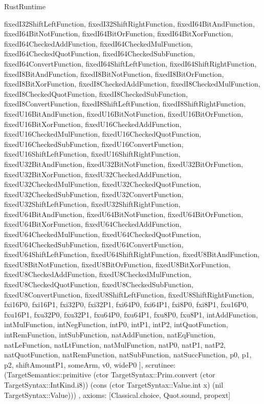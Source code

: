 \begin{lexlean}{RustRuntime}
\begin{semanticmodule}
{{      fixedI32ShiftLeftFunction,
      fixedI32ShiftRightFunction,
      fixedI64BitAndFunction,
      fixedI64BitNotFunction,
      fixedI64BitOrFunction,
      fixedI64BitXorFunction,
      fixedI64CheckedAddFunction,
      fixedI64CheckedMulFunction,
      fixedI64CheckedQuotFunction,
      fixedI64CheckedSubFunction,
      fixedI64ConvertFunction,
      fixedI64ShiftLeftFunction,
      fixedI64ShiftRightFunction,
      fixedI8BitAndFunction,
      fixedI8BitNotFunction,
      fixedI8BitOrFunction,
      fixedI8BitXorFunction,
      fixedI8CheckedAddFunction,
      fixedI8CheckedMulFunction,
      fixedI8CheckedQuotFunction,
      fixedI8CheckedSubFunction,
      fixedI8ConvertFunction,
      fixedI8ShiftLeftFunction,
      fixedI8ShiftRightFunction,
      fixedU16BitAndFunction,
      fixedU16BitNotFunction,
      fixedU16BitOrFunction,
      fixedU16BitXorFunction,
      fixedU16CheckedAddFunction,
      fixedU16CheckedMulFunction,
      fixedU16CheckedQuotFunction,
      fixedU16CheckedSubFunction,
      fixedU16ConvertFunction,
      fixedU16ShiftLeftFunction,
      fixedU16ShiftRightFunction,
      fixedU32BitAndFunction,
      fixedU32BitNotFunction,
      fixedU32BitOrFunction,
      fixedU32BitXorFunction,
      fixedU32CheckedAddFunction,
      fixedU32CheckedMulFunction,
      fixedU32CheckedQuotFunction,
      fixedU32CheckedSubFunction,
      fixedU32ConvertFunction,
      fixedU32ShiftLeftFunction,
      fixedU32ShiftRightFunction,
      fixedU64BitAndFunction,
      fixedU64BitNotFunction,
      fixedU64BitOrFunction,
      fixedU64BitXorFunction,
      fixedU64CheckedAddFunction,
      fixedU64CheckedMulFunction,
      fixedU64CheckedQuotFunction,
      fixedU64CheckedSubFunction,
      fixedU64ConvertFunction,
      fixedU64ShiftLeftFunction,
      fixedU64ShiftRightFunction,
      fixedU8BitAndFunction,
      fixedU8BitNotFunction,
      fixedU8BitOrFunction,
      fixedU8BitXorFunction,
      fixedU8CheckedAddFunction,
      fixedU8CheckedMulFunction,
      fixedU8CheckedQuotFunction,
      fixedU8CheckedSubFunction,
      fixedU8ConvertFunction,
      fixedU8ShiftLeftFunction,
      fixedU8ShiftRightFunction,
      fxi16P0,
      fxi16P1,
      fxi32P0,
      fxi32P1,
      fxi64P0,
      fxi64P1,
      fxi8P0,
      fxi8P1,
      fxu16P0,
      fxu16P1,
      fxu32P0,
      fxu32P1,
      fxu64P0,
      fxu64P1,
      fxu8P0,
      fxu8P1,
      intAddFunction,
      intMulFunction,
      intNegFunction,
      intP0,
      intP1,
      intP2,
      intQuotFunction,
      intRemFunction,
      intSubFunction,
      natAddFunction,
      natEqFunction,
      natLeFunction,
      natLtFunction,
      natMulFunction,
      natP0,
      natP1,
      natP2,
      natQuotFunction,
      natRemFunction,
      natSubFunction,
      natSuccFunction,
      p0,
      p1,
      p2,
      shiftAmountP1,
      someArm,
      v0,
      wideP0
    ],
    scrutinee: (TargetSemantics::primitive (ctor TargetSyntax::Prim.convert (ctor TargetSyntax::IntKind.i8)) (cons (ctor TargetSyntax::Value.int x) (nil TargetSyntax::Value)))
  },
  axioms: [Classical.choice, Quot.sound, propext]
}


\end{semanticmodule}
\end{lexlean}
